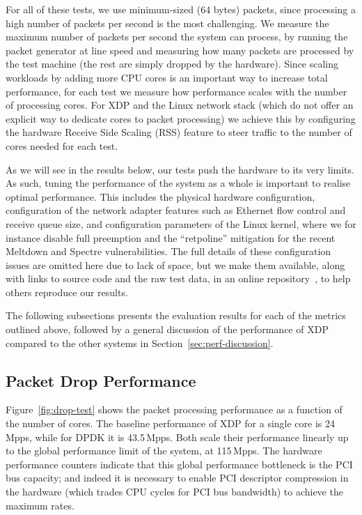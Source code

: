 \documentclass[10pt,sigconf,anonymous]{acmart}
\begin{document}
For all of these tests, we use minimum-sized (64 bytes) packets, since
processing a high number of packets per second is the most challenging. We
measure the maximum number of packets per second the system can process, by
running the packet generator at line speed and measuring how many packets are
processed by the test machine (the rest are simply dropped by the hardware).
Since scaling workloads by adding more CPU cores is an important way to increase
total performance, for each test we measure how performance scales with the
number of processing cores. For XDP and the Linux network stack (which do not
offer an explicit way to dedicate cores to packet processing) we achieve this by
configuring the hardware Receive Side Scaling (RSS) feature to steer traffic to
the number of cores needed for each test.

As we will see in the results below, our tests push the hardware to its very
limits. As such, tuning the performance of the system as a whole is important to
realise optimal performance. This includes the physical hardware configuration,
configuration of the network adapter features such as Ethernet flow control and
receive queue size, and configuration parameters of the Linux kernel, where we
for instance disable full preemption and the ``retpoline'' mitigation for the
recent Meltdown and Spectre vulnerabilities. The full details of these
configuration issues are omitted here due to lack of space, but we make them
available, along with links to source code and the raw test data, in an online
repository~\cite{test-data}, to help others reproduce our results.

The following subsections presents the evaluation results for each of the
metrics outlined above, followed by a general discussion of the performance of
XDP compared to the other systems in Section~\ref{sec:perf-discussion}.

\subsection{Packet Drop Performance}
\label{sec:basel-pack-proc}
Figure~\ref{fig:drop-test} shows the packet processing performance as a function
of the number of cores. The baseline performance of XDP for a single core is
24\,Mpps, while for DPDK it is 43.5\,Mpps. Both scale their performance linearly
up to the global performance limit of the system, at 115\,Mpps. The hardware
performance counters indicate that this global performance bottleneck is the PCI
bus capacity; and indeed it is necessary to enable PCI descriptor compression in
the hardware (which trades CPU cycles for PCI bus bandwidth) to achieve the
maximum rates.
\end{document}

